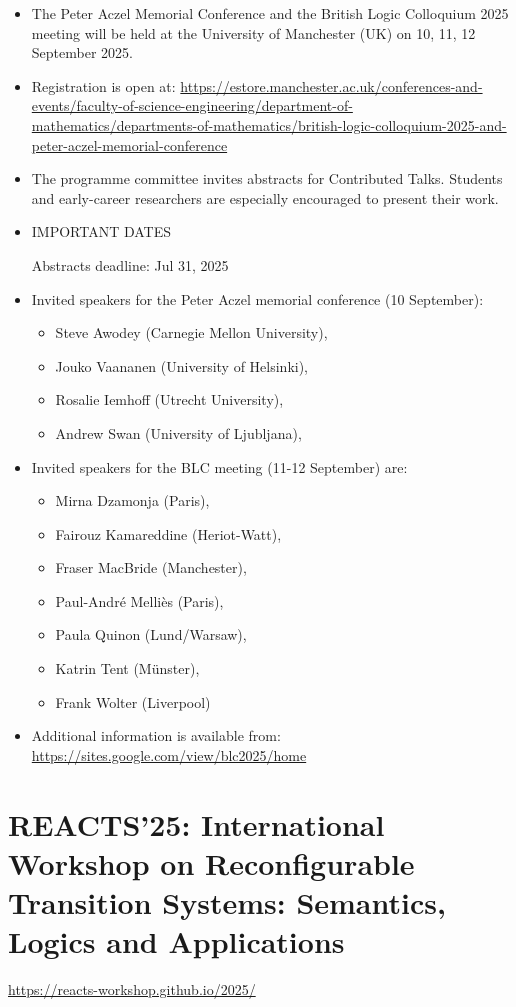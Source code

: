 \documentclass[prodmode,acmtecs]{acmsmall} %
\begin{document}
\begin{itemize}\item  The Peter Aczel Memorial Conference and the British Logic Colloquium 2025 meeting will be held at the University of Manchester (UK) on 10, 11, 12 September 2025.  
 
\item  Registration is open at: \href{https://estore.manchester.ac.uk/conferences-and-events/faculty-of-science-engineering/department-of-mathematics/departments-of-mathematics/british-logic-colloquium-2025-and-peter-aczel-memorial-conference}{https://estore.manchester.ac.uk/conferences-and-events/faculty-of-science-engineering/department-of-mathematics/departments-of-mathematics/british-logic-colloquium-2025-and-peter-aczel-memorial-conference} 
 
\item  The programme committee invites abstracts for Contributed Talks. Students and early-career researchers are especially encouraged to present their work.  
 
\item  IMPORTANT DATES 
 
Abstracts deadline: Jul 31, 2025 
 
\item  Invited speakers for the Peter Aczel memorial conference (10 September): 
 
\begin{itemize}\item  Steve Awodey (Carnegie Mellon University),
\item  Jouko Vaananen (University of Helsinki),
\item  Rosalie Iemhoff (Utrecht University),
\item  Andrew Swan (University of Ljubljana),
\end{itemize} 
\item  Invited speakers for the BLC meeting (11-12 September) are: 
 
\begin{itemize}\item  Mirna Dzamonja (Paris),
\item  Fairouz Kamareddine (Heriot-Watt),
\item  Fraser MacBride (Manchester),
\item  Paul-André Melliès (Paris),
\item  Paula Quinon (Lund/Warsaw),
\item  Katrin Tent (Münster),
\item  Frank Wolter (Liverpool)
\end{itemize} 
\item  Additional information is available from: \href{https://sites.google.com/view/blc2025/home}{https://sites.google.com/view/blc2025/home} 
 
\end{itemize}\section{REACTS'25: International Workshop on Reconfigurable Transition Systems: Semantics, Logics and Applications}\label{REACTS25}  \href{https://reacts-workshop.github.io/2025/}{https://reacts-workshop.github.io/2025/}\\ 
\end{document}
